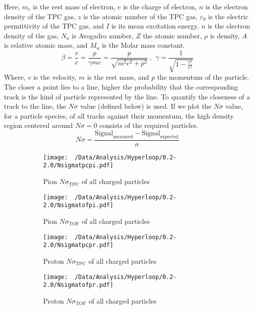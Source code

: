 \documentclass[12pt,a4paper,twoside]{report}
\begin{document}
Here, $m_e$ is the rest mass of electron, $e$ is the charge of electron,  $n$ is the electron density of the TPC gas, $z$ is the atomic number of the TPC gas, $\varepsilon_0$ is the electric permittivity of the TPC gas, and $I$ is its mean excitation energy. $n$ is the electron density of the gas, $N_a$ is Avogadro number, $Z$ the atomic number, $\rho$ is density, $A$ is relative atomic mass, and $M_u$ is the Molar mass constant.
\begin{equation}
	\beta=\frac{v}{c}=\frac{p}{\gamma mc}=\frac{p}{\sqrt{m^2c^2+p^2}}\ , \ \
	\gamma=\frac{1}{\sqrt{1-\frac{v^2}{c^2}}}
\end{equation}
Where, $v$ is the velocity, $m$ is the rest mass, and $p$ the momentum of the particle.
\\

The closer a point lies to a line, higher the probability that the corresponding track is the kind of particle represented by the line. To quantify the closeness of a track to the line, the $N\sigma$ value (defined below) is used. If we plot the $N\sigma$ value, for a particle species, of all tracks against their momentum, the high density region centered around $N\sigma=0$ consists of the required particles.
\begin{equation}
	N\sigma=\frac{\mathrm{Signal}_\mathrm{measured}-\mathrm{Signal}_\mathrm{expected}}{\sigma}
\end{equation}
\begin{figure}[H]
	\begin{subfigure}{0.49\linewidth}
		\texttt{[image: ~/Data/Analysis/Hyperloop/0.2-2.0/Nsigmatpcpi.pdf]}
		\caption{Pion $N\sigma_\mathrm{TPC}$ of all charged particles}
	\end{subfigure}
	\begin{subfigure}{0.49\linewidth}
		\texttt{[image: ~/Data/Analysis/Hyperloop/0.2-2.0/Nsigmatofpi.pdf]}
		\caption{Pion $N\sigma_\mathrm{TOF}$ of all charged particles}
	\end{subfigure}
	\begin{subfigure}{0.49\linewidth}
		\texttt{[image: ~/Data/Analysis/Hyperloop/0.2-2.0/Nsigmatpcpr.pdf]}
		\caption{Proton $N\sigma_\mathrm{TPC}$ of all charged particles}
	\end{subfigure}
	\begin{subfigure}{0.49\linewidth}
		\texttt{[image: ~/Data/Analysis/Hyperloop/0.2-2.0/Nsigmatofpr.pdf]}
		\caption{Proton $N\sigma_\mathrm{TOF}$ of all charged particles}
	\end{subfigure}
	\caption{}
\end{figure}
\end{document}
